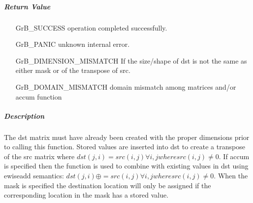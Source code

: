 \subparagraph{Return Value}


\begin{itemize}[leftmargin=2.1in]
\item[{\sf GrB\_SUCCESS}]     operation completed successfully.
\item[{\sf GrB\_PANIC}]        unknown internal error.
\item[{\sf GrB\_DIMENSION\_MISMATCH}]      
        If the size/shape of dst is not the same as either mask or
        of the transpose of src.
\item[{\sf GrB\_DOMAIN\_MISMATCH}]  
        domain mismatch among matrices and/or
        accum function 
\end{itemize}

\subparagraph{Description}

The dst matrix must have already been created with the proper dimensions
prior to calling this function.  Stored values are inserted into dst to
create a transpose of the src matrix where 
$dst(j,i) = src(i,j) \forall i,j where src(i,j) \neq 0$.
If accum is specified then the function is used to combine with existing values in dst using ewiseadd semantics:
$dst(j,i) \oplus = src(i,j) \forall i,j where src(i,j) \neq 0$.
When the mask is specified the destination location will only be assigned if the corresponding location in the mask has a stored value.





